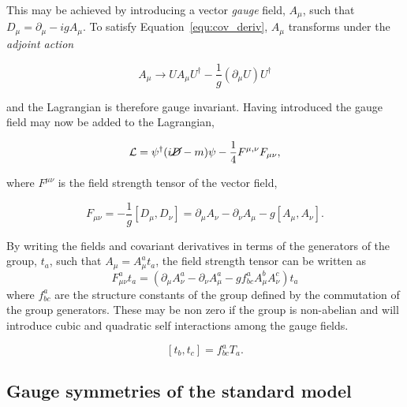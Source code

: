 This may be achieved by introducing a vector \emph{gauge} field, $A_\mu$, such that 
$D_{\mu} = \partial_{\mu} - igA_{\mu}$. To satisfy Equation~\ref{equ:cov_deriv},
$A_{\mu}$ transforms under the \emph{adjoint action}

\begin{equation}
A_{\mu} \rightarrow U A_{\mu} U^{\dagger} - \frac{1}{g}(\partial_{\mu}U)U^{\dagger}
\end{equation}

and the Lagrangian is therefore gauge invariant. Having introduced the gauge field may now be added to the Lagrangian,

\begin{equation}
\mathcal{L} = \psi^{\dagger} (i\cancel{D} - m)\psi - \frac{1}{4}F^{\mu,\nu}F_{\mu\nu},
\end{equation}

where $F^{\mu\nu}$ is the field strength tensor of the vector field,

\begin{equation}
F_{\mu\nu} = - \frac{1}{g}\left[D_{\mu},D_{\nu}\right] = \partial_{\mu}A_{\nu} - \partial_{\nu} A_{\mu} - g\left[A_{\mu},A_{\nu}\right].
\end{equation}

By writing the fields and covariant derivatives in terms of the generators of the group, $t_{a}$, such
that $A_{\mu} = A^{a}_{\mu} t_{a}$, the field strength tensor can be written as 
\begin{equation}
F^{a}_{\mu\nu}t_{a} = \left(\partial_{\mu}A^{a}_{\nu} - \partial_{\nu} A^{a}_{\mu} - g f_{bc}^{a}A^b_{\mu}A^c_{\nu}\right)t_a
\end{equation}
where $f_{bc}^{a}$ are the structure constants of the group defined by the 
commutation of the group generators. These may be non zero if the group is non-abelian and will introduce
cubic and quadratic self interactions among the gauge fields.

\begin{equation}
\left[t_b,t_c\right] = f_{bc}^{a}T_{a}. 
\end{equation}

\subsection{Gauge symmetries of the standard model}

